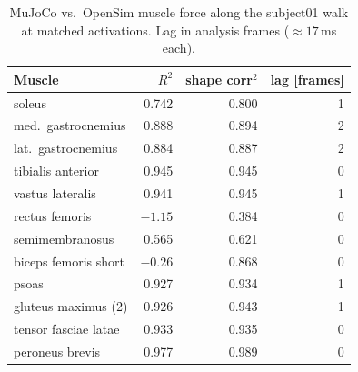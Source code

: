 \begin{table}[h]
  \centering
  \caption{MuJoCo vs.\ OpenSim muscle force along the subject01 walk at
  matched activations. Lag in analysis frames ($\approx 17$\,ms each).}
  \label{tab:force-r2}
  \small
  \begin{tabular}{lrrr}
    \toprule
    Muscle & $R^2$ & shape corr$^2$ & lag [frames] \\
    \midrule
    soleus   & 0.742 & 0.800 & 1 \\
    med.\ gastrocnemius & 0.888 & 0.894 & 2 \\
    lat.\ gastrocnemius & 0.884 & 0.887 & 2 \\
    tibialis anterior & 0.945 & 0.945 & 0 \\
    vastus lateralis & 0.941 & 0.945 & 1 \\
    rectus femoris & $-1.15$ & 0.384 & 0 \\
    semimembranosus & 0.565 & 0.621 & 0 \\
    biceps femoris short & $-0.26$ & 0.868 & 0 \\
    psoas & 0.927 & 0.934 & 1 \\
    gluteus maximus (2) & 0.926 & 0.943 & 1 \\
    tensor fasciae latae & 0.933 & 0.935 & 0 \\
    peroneus brevis & 0.977 & 0.989 & 0 \\
    \bottomrule
  \end{tabular}
\end{table}

